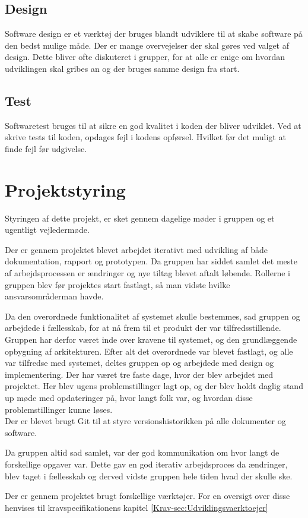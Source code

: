\subsection{Design}
Software design er et værktøj der bruges blandt udviklere til at skabe software på den bedst mulige måde. Der er mange overvejelser der skal gøres ved valget af design. Dette bliver ofte diskuteret i grupper, for at alle er enige om hvordan udviklingen skal gribes an og der bruges samme design fra start.

\subsection{Test}
Softwaretest bruges til at sikre en god kvalitet i koden der bliver udviklet. Ved at skrive tests til koden, opdages fejl i kodens opførsel. Hvilket før det muligt at finde fejl før udgivelse.
\newline

\section{Projektstyring}
Styringen af dette projekt, er sket gennem dagelige møder i gruppen og et ugentligt vejledermøde.
 
Der er gennem projektet blevet arbejdet iterativt med udvikling af både dokumentation, rapport og prototypen. Da gruppen har siddet samlet det meste af arbejdsprocessen er ændringer og nye tiltag blevet aftalt løbende.
Rollerne i gruppen blev før projektes start fastlagt, så man vidste hvilke ansvarsområderman havde.

Da den overordnede funktionalitet af systemet skulle bestemmes, sad gruppen og arbejdede i fællesskab, for at nå frem til et produkt der var tilfredsstillende. Gruppen har derfor været inde over kravene til systemet, og den grundlæggende opbygning af arkitekturen.
Efter alt det overordnede var blevet fastlagt, og alle var tilfredse med systemet, deltes gruppen op og arbejdede med design og implementering.
Der har været tre faste dage, hvor der blev arbejdet med projektet. Her blev ugens problemstillinger lagt op, og der blev holdt daglig stand up møde med opdateringer på, hvor langt folk var, og hvordan disse problemstillinger kunne løses. \\
Der er blevet brugt Git til at styre versionshistorikken på alle dokumenter og software. 

Da gruppen altid sad samlet, var der god kommunikation om hvor langt de forskellige opgaver var.
Dette gav en god iterativ arbejdsproces da ændringer, blev taget i fællesskab og derved vidste gruppen hele tiden hvad der skulle ske.

Der er gennem projektet brugt forskellige værktøjer. For en oversigt over disse henvises til kravspecifikationens kapitel \ref{Krav-sec:Udviklingsvaerktoejer}
